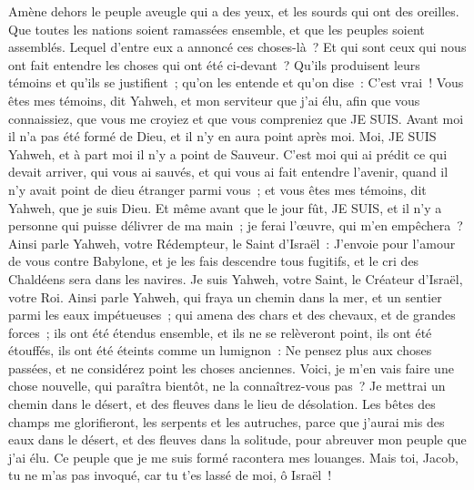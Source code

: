 \begin{multicols}{2}
Amène dehors le peuple aveugle qui a des yeux, et les sourds qui ont des oreilles.
Que toutes les nations soient ramassées ensemble, et que les peuples soient assemblés. Lequel d'entre eux a annoncé ces choses-là~? Et qui sont ceux qui nous ont fait entendre les choses qui ont été ci-devant~? Qu'ils produisent leurs témoins et qu'ils se justifient~; qu'on les entende et qu'on dise~: C'est vrai~!
Vous êtes mes témoins, dit Yahweh, et mon serviteur que j'ai élu, afin que vous connaissiez, que vous me croyiez et que vous compreniez que JE SUIS. Avant moi il n'a pas été formé de Dieu, et il n'y en aura point après moi.
Moi, JE SUIS Yahweh, et à part moi il n'y a point de Sauveur.
C'est moi qui ai prédit ce qui devait arriver, qui vous ai sauvés, et qui vous ai fait entendre l'avenir, quand il n'y avait point de dieu étranger parmi vous~; et vous êtes mes témoins, dit Yahweh, que je suis Dieu.
Et même avant que le jour fût, JE SUIS, et il n'y a personne qui puisse délivrer de ma main~; je ferai l'œuvre, qui m'en empêchera~?
Ainsi parle Yahweh, votre Rédempteur, le Saint d'Israël~: J'envoie pour l'amour de vous contre Babylone, et je les fais descendre tous fugitifs, et le cri des Chaldéens sera dans les navires.
Je suis Yahweh, votre Saint, le Créateur d'Israël, votre Roi.
Ainsi parle Yahweh, qui fraya un chemin dans la mer, et un sentier parmi les eaux impétueuses~;
qui amena des chars et des chevaux, et de grandes forces~; ils ont été étendus ensemble, et ils ne se relèveront point, ils ont été étouffés, ils ont été éteints comme un lumignon~:
Ne pensez plus aux choses passées, et ne considérez point les choses anciennes.
Voici, je m'en vais faire une chose nouvelle, qui paraîtra bientôt, ne la connaîtrez-vous pas~? Je mettrai un chemin dans le désert, et des fleuves dans le lieu de désolation.
Les bêtes des champs me glorifieront, les serpents et les autruches, parce que j'aurai mis des eaux dans le désert, et des fleuves dans la solitude, pour abreuver mon peuple que j'ai élu.
Ce peuple que je me suis formé racontera mes louanges.
Mais toi, Jacob, tu ne m'as pas invoqué, car tu t'es lassé de moi, ô Israël~!

\end{multicols}
